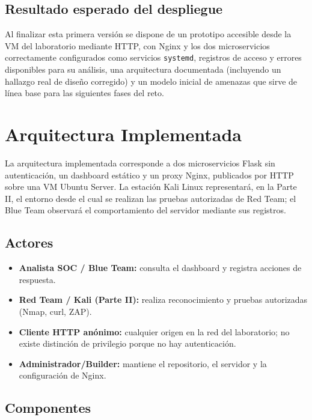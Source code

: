\documentclass[journal]{IEEEtran}
\begin{document}
\subsection{Resultado esperado del despliegue}

Al finalizar esta primera versión se dispone de un prototipo accesible desde
la VM del laboratorio mediante HTTP, con Nginx y los dos microservicios
correctamente configurados como servicios \texttt{systemd}, registros de
acceso y errores disponibles para su análisis, una arquitectura documentada
(incluyendo un hallazgo real de diseño corregido) y un modelo inicial de
amenazas que sirve de línea base para las siguientes fases del reto.

\section{Arquitectura Implementada}

La arquitectura implementada corresponde a dos microservicios Flask sin
autenticación, un dashboard estático y un proxy Nginx, publicados por HTTP
sobre una VM Ubuntu Server. La estación Kali Linux representará, en la
Parte II, el entorno desde el cual se realizan las pruebas autorizadas de
Red Team; el Blue Team observará el comportamiento del servidor mediante sus
registros.

\subsection{Actores}

\begin{itemize}
    \item \textbf{Analista SOC / Blue Team:} consulta el dashboard y registra
    acciones de respuesta.
    \item \textbf{Red Team / Kali (Parte II):} realiza reconocimiento y
    pruebas autorizadas (Nmap, curl, ZAP).
    \item \textbf{Cliente HTTP anónimo:} cualquier origen en la red del
    laboratorio; no existe distinción de privilegio porque no hay
    autenticación.
    \item \textbf{Administrador/Builder:} mantiene el repositorio, el servidor
    y la configuración de Nginx.
\end{itemize}

\subsection{Componentes}
\end{document}
